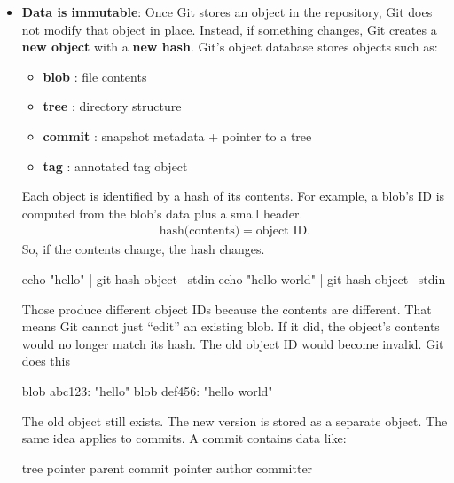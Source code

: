 \documentclass{report}
\begin{document}
    \begin{itemize}
        \item \textbf{Data is immutable}: Once Git stores an object in the repository, Git does not modify that object in place. Instead, if something changes, Git creates a \textbf{new object} with a \textbf{new hash}.
            \bigbreak \noindent 
            Git’s object database stores objects such as:
            \begin{itemize}
                \item \textbf{blob   }: file contents
                \item \textbf{tree   }: directory structure
                \item \textbf{commit }: snapshot metadata + pointer to a tree
                \item \textbf{tag    }: annotated tag object
            \end{itemize}
            Each object is identified by a hash of its contents. For example, a blob’s ID is computed from the blob’s data plus a small header.
            \begin{align*}
                \text{hash(contents)} = \text{object ID}
            .\end{align*}
            So, if the contents change, the hash changes.
            \bigbreak \noindent 
            \begin{bashcode}
                echo "hello" | git hash-object --stdin
                echo "hello world" | git hash-object --stdin
            \end{bashcode}
            \bigbreak \noindent 
            Those produce different object IDs because the contents are different. That means Git cannot just “edit” an existing blob. If it did, the object’s contents would no longer match its hash. The old object ID would become invalid.
            \bigbreak \noindent 
            Git does this
            \bigbreak \noindent 
            \begin{bashcode}
                blob abc123: "hello"
                blob def456: "hello world"
            \end{bashcode}
            \bigbreak \noindent 
            The old object still exists. The new version is stored as a separate object. The same idea applies to commits. A commit contains data like:
            \bigbreak \noindent 
            \begin{bashcode}
                tree pointer
                parent commit pointer
                author
                committer

\end{bashcode}
\end{itemize}
\end{document}
